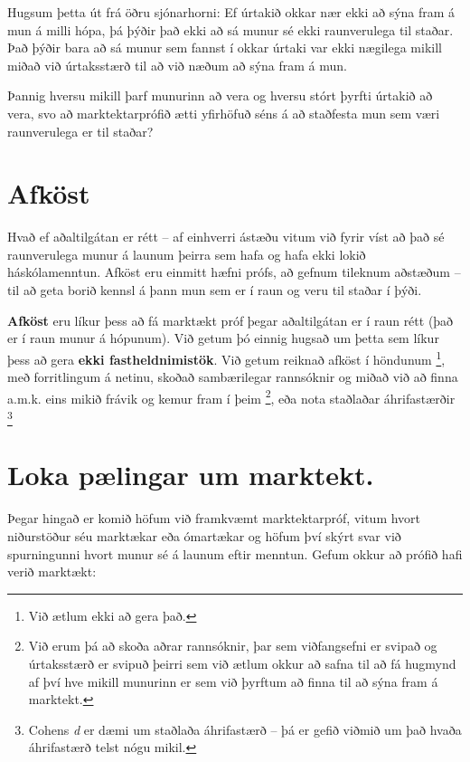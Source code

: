 \documentclass[
]{book}
\begin{document}
Hugsum þetta út frá öðru sjónarhorni: Ef úrtakið okkar nær ekki að sýna fram á mun á milli hópa, þá þýðir það ekki að sá munur sé ekki raunverulega til staðar. Það þýðir bara að sá munur sem fannst í okkar úrtaki var ekki nægilega mikill miðað við úrtaksstærð til að við næðum að sýna fram á mun.

Þannig hversu mikill þarf munurinn að vera og hversu stórt þyrfti úrtakið að vera, svo að marktektarprófið ætti yfirhöfuð séns á að staðfesta mun sem væri raunverulega er til staðar?

\hypertarget{afkuxf6st}{%
\section{Afköst}\label{afkuxf6st}}

Hvað ef aðaltilgátan er rétt -- af einhverri ástæðu vitum við fyrir víst að það sé raunverulega munur á launum þeirra sem hafa og hafa ekki lokið háskólamenntun. Afköst eru einmitt hæfni prófs, að gefnum tileknum aðstæðum -- til að geta borið kennsl á þann mun sem er í raun og veru til staðar í þýði.

\textbf{Afköst} eru líkur þess að fá marktækt próf þegar aðaltilgátan er í raun rétt (það er í raun munur á hópunum). Við getum þó einnig hugsað um þetta sem líkur þess að gera \textbf{ekki fastheldnimistök}. Við getum reiknað afköst í höndunum \footnote{Við ætlum ekki að gera það.}, með forritlingum á netinu, skoðað sambærilegar rannsóknir og miðað við að finna a.m.k. eins mikið frávik og kemur fram í þeim \footnote{Við erum þá að skoða aðrar rannsóknir, þar sem viðfangsefni er svipað og úrtaksstærð er svipuð þeirri sem við ætlum okkur að safna til að fá hugmynd af því hve mikill munurinn er sem við þyrftum að finna til að sýna fram á marktekt.}, eða nota staðlaðar áhrifastærðir \footnote{Cohens \emph{d} er dæmi um staðlaða áhrifastærð -- þá er gefið viðmið um það hvaða áhrifastærð telst nógu mikil.}

\hypertarget{loka-puxe6lingar-um-marktekt.}{%
\section{Loka pælingar um marktekt.}\label{loka-puxe6lingar-um-marktekt.}}

Þegar hingað er komið höfum við framkvæmt marktektarpróf, vitum hvort niðurstöður séu marktækar eða ómartækar og höfum því skýrt svar við spurningunni hvort munur sé á launum eftir menntun. Gefum okkur að prófið hafi verið marktækt:
\end{document}

